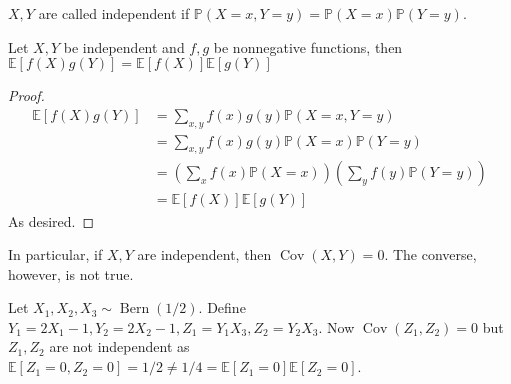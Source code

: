 \begin{definition}
    $X,Y$ are called independent if $\mathbb P(X=x,Y=y)=\mathbb P(X=x)\mathbb P(Y=y)$.
\end{definition}
\begin{proposition}
    Let $X,Y$ be independent and $f,g$ be nonnegative functions, then $\mathbb E[f(X)g(Y)]=\mathbb E[f(X)]\mathbb E[g(Y)]$
\end{proposition}
\begin{proof}
    \begin{align*}
        \mathbb E[f(X)g(Y)]&=\sum_{x,y}f(x)g(y)\mathbb P(X=x,Y=y)\\
        &=\sum_{x,y}f(x)g(y)\mathbb P(X=x)\mathbb P(Y=y)\\
        &=\left( \sum_xf(x)\mathbb P(X=x) \right)\left( \sum_yf(y)\mathbb P(Y=y) \right)\\
        &=\mathbb E[f(X)]\mathbb E[g(Y)]
    \end{align*}
    As desired.
\end{proof}
In particular, if $X,Y$ are independent, then $\operatorname{Cov}(X,Y)=0$.
The converse, however, is not true.
\begin{example}
    Let $X_1,X_2,X_3\sim\operatorname{Bern}(1/2)$.
    Define $Y_1=2X_1-1,Y_2=2X_2-1,Z_1=Y_1X_3,Z_2=Y_2X_3$.
    Now $\operatorname{Cov}(Z_1,Z_2)=0$ but $Z_1,Z_2$ are not independent as $\mathbb E[Z_1=0,Z_2=0]=1/2\neq1/4=\mathbb E[Z_1=0]\mathbb E[Z_2=0]$.
\end{example}
